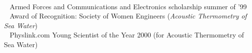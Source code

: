 \documentclass[11pt]{seilercv}
\begin{document}
\begin{textblock}{9.6}
\begin{tabbing}
\\{\textbullet~ Armed Forces and Communications and Electronics scholarship summer of '99 }
\\{\textbullet~ Award of Recognition: Society of Women Engineers (\textit{Acoustic Thermometry of Sea Water}) }
\\{\textbullet~ Physlink.com Young Scientist of the Year 2000 (for Acoustic Thermometry of Sea Water)}
\end{tabbing}
\end{textblock}
\pagebreak
\end{document}
